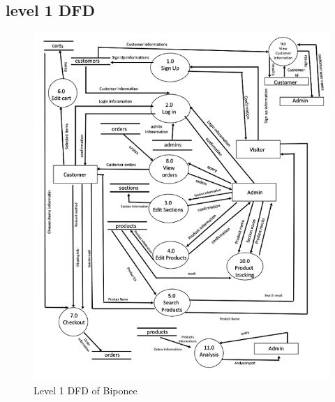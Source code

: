 \newpage

\subsection{level 1 DFD}
 \begin{figure}
 \centering
\includegraphics{figures/1s.png}
\caption{Level 1 DFD of Biponee}
\end{figure}


\newpage

